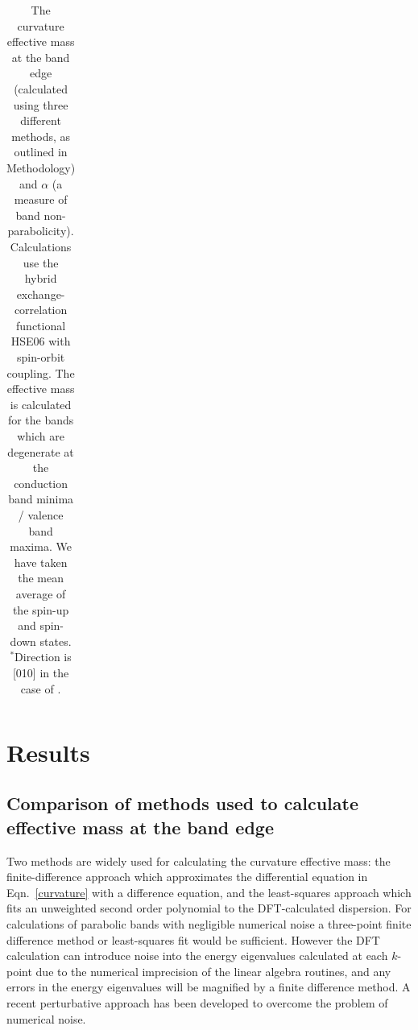 \begin{landscape}
\begin{table}[tb]
\begin{tabular}{@{}lclllclllclllclll@{}}
\end{tabular} 
\caption[Values of effective mass and the alpha parameter]{\label{largetable} The curvature effective mass at the band edge (calculated using three different methods, as outlined in Methodology) and $\alpha$ (a measure of band non-parabolicity). Calculations use the hybrid exchange-correlation functional HSE06 with spin-orbit coupling. The effective mass is calculated for the bands which are degenerate at the conduction band minima / valence band maxima. We have taken the mean average of the spin-up and spin-down states. $^*$Direction is [010] in the case of . }
\end{table}
\end{landscape}

\section{Results}

\subsection{Comparison of methods used to calculate effective mass at the band edge}

Two methods are widely used for calculating the curvature effective mass:
the finite-difference approach which approximates the differential equation in Eqn.\ \ref{curvature} with a difference equation,
and the least-squares approach which fits an unweighted second order polynomial to the DFT-calculated dispersion. 
For calculations of parabolic bands with negligible numerical noise a three-point finite difference method or least-squares fit would be sufficient. 
However the DFT calculation can introduce noise into the energy eigenvalues calculated at each $k$-point due to the numerical imprecision of the linear algebra routines,
and any errors in the energy eigenvalues will be magnified by a finite difference method.\autocite{Nearing2010} 
A recent perturbative approach has been developed to overcome the problem of numerical noise.\autocite{Laflamme2016} 

